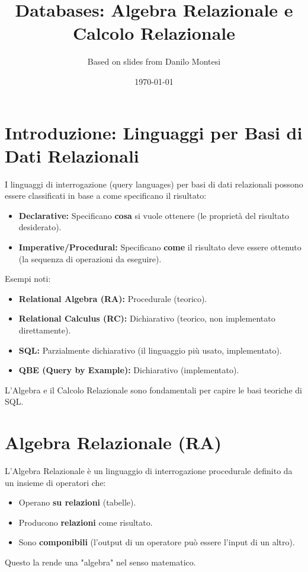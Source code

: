 \documentclass{article}
\title{Databases: Algebra Relazionale e Calcolo Relazionale}
\author{Based on slides from Danilo Montesi}
\date{\today}
\begin{document}
	
	\maketitle
	
	\section{Introduzione: Linguaggi per Basi di Dati Relazionali}
	
	I linguaggi di interrogazione (query languages) per basi di dati relazionali possono essere classificati in base a come specificano il risultato:
	\begin{itemize}
		\item \textbf{Declarative:} Specificano \textbf{cosa} si vuole ottenere (le proprietà del risultato desiderato).
		\item \textbf{Imperative/Procedural:} Specificano \textbf{come} il risultato deve essere ottenuto (la sequenza di operazioni da eseguire).
	\end{itemize}
	
	Esempi noti:
	\begin{itemize}
		\item \textbf{Relational Algebra (RA):} Procedurale (teorico).
		\item \textbf{Relational Calculus (RC):} Dichiarativo (teorico, non implementato direttamente).
		\item \textbf{SQL:} Parzialmente dichiarativo (il linguaggio più usato, implementato).
		\item \textbf{QBE (Query by Example):} Dichiarativo (implementato).
	\end{itemize}
	L'Algebra e il Calcolo Relazionale sono fondamentali per capire le basi teoriche di SQL.
	
	\section{Algebra Relazionale (RA)}
	
	L'Algebra Relazionale è un linguaggio di interrogazione procedurale definito da un insieme di operatori che:
	\begin{itemize}
		\item Operano \textbf{su relazioni} (tabelle).
		\item Producono \textbf{relazioni} come risultato.
		\item Sono \textbf{componibili} (l'output di un operatore può essere l'input di un altro).
	\end{itemize}
	Questo la rende una "algebra" nel senso matematico.
	
\end{document}
